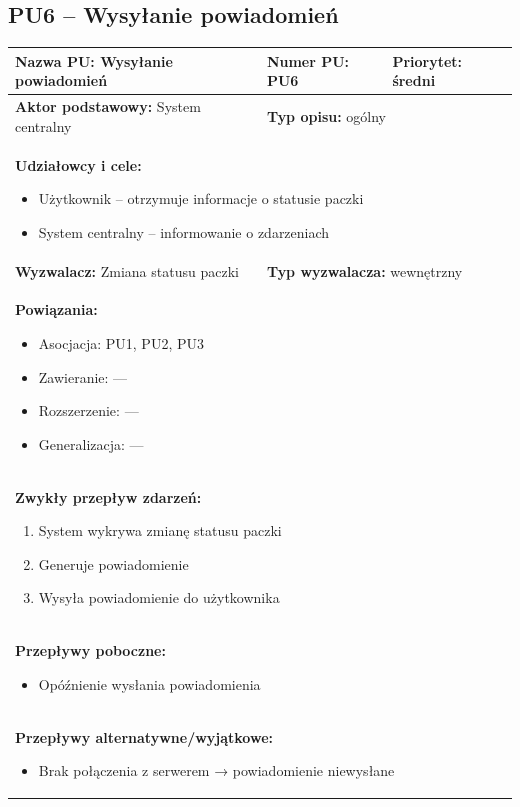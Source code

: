 \documentclass[a4paper,12pt]{article}
\begin{document}
\vspace{1cm}

\subsection{PU6 – Wysyłanie powiadomień}

\begin{tabular}{|p{6cm}|p{4cm}|p{5cm}|}
\hline
\textbf{Nazwa PU:} Wysyłanie powiadomień &
\textbf{Numer PU:} PU6 &
\textbf{Priorytet:} średni \\
\hline
\textbf{Aktor podstawowy:} System centralny &
\multicolumn{2}{p{9cm}|}{\textbf{Typ opisu:} ogólny} \\
\hline
\multicolumn{3}{|p{15cm}|}{
\textbf{Udziałowcy i cele:}
\begin{itemize}
\item Użytkownik – otrzymuje informacje o statusie paczki
\item System centralny – informowanie o zdarzeniach
\end{itemize}
} \\
\hline
\textbf{Wyzwalacz:} Zmiana statusu paczki &
\multicolumn{2}{p{9cm}|}{\textbf{Typ wyzwalacza:} wewnętrzny} \\
\hline
\multicolumn{3}{|p{15cm}|}{
\textbf{Powiązania:}
\begin{itemize}
\item Asocjacja: PU1, PU2, PU3
\item Zawieranie: —
\item Rozszerzenie: —
\item Generalizacja: —
\end{itemize}
} \\
\hline
\multicolumn{3}{|p{15cm}|}{
\textbf{Zwykły przepływ zdarzeń:}
\begin{enumerate}
\item System wykrywa zmianę statusu paczki
\item Generuje powiadomienie
\item Wysyła powiadomienie do użytkownika
\end{enumerate}
} \\
\hline
\multicolumn{3}{|p{15cm}|}{
\textbf{Przepływy poboczne:}
\begin{itemize}
\item Opóźnienie wysłania powiadomienia
\end{itemize}
} \\
\hline
\multicolumn{3}{|p{15cm}|}{
\textbf{Przepływy alternatywne/wyjątkowe:}
\begin{itemize}
\item Brak połączenia z serwerem → powiadomienie niewysłane
\end{itemize}
} \\
\hline
\end{tabular}
\end{document}
